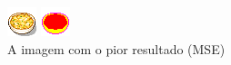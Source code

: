 \begin{figure}[h!]
	\caption{A imagem com o pior resultado (MSE)}
    \label{fig:badmse}
    \centering
    \begin{minipage}[b]{0.25\textwidth}
        \includegraphics[width=\textwidth]{imagens/41_eggsalad_bowl.png}
    \end{minipage}
    \hfill
    \begin{minipage}[b]{0.25\textwidth}
        \includegraphics[width=\textwidth]{imagens/41_eggsalad_bowl.expected.png}

\end{minipage}
\end{figure}
